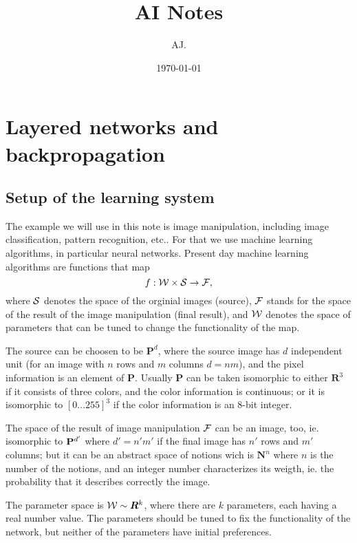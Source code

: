 \documentclass{article}
\title{AI Notes}
\author{AJ.}
\date{\today}
\begin{document}
\maketitle

\section{Layered networks and backpropagation}
\label{sec:lbp}

\subsection{Setup of the learning system}

The example we will use in this note is image manipulation, including
image classification, pattern recognition, etc.. For that we use
machine learning algorithms, in particular neural networks. Present
day machine learning algorithms are functions that map
\begin{equation}
  f :  {\cal W} \times {\cal S} \to {\cal F},
\end{equation}
where ${\cal S}$ denotes the space of the orginial images (source),
${\cal F}$ stands for the space of the result of the image
manipulation (final result), and ${\cal W}$ denotes the space of
parameters that can be tuned to change the functionality of the map.

The source can be choosen to be ${\bm P}^d$, where the source image
has $d$ independent unit (for an image with $n$ rows and $m$ columns
$d=nm$), and the pixel information is an element of $\bm P$. Usually
$\bm P$ can be taken isomorphic to either $\bm R^3$ if it consists of
three colors, and the color information is continuous; or it is
isomorphic to $[0...255]^3$ if the color information is an 8-bit
integer.

The space of the result of image manipulation ${\cal F}$ can be an
image, too, ie. isomorphic to ${\bf P}^{d'}$ where $d'=n'm'$ if the
final image has $n'$ rows and $m'$ columns; but it can be an abstract
space of notions wich is $\bm N^n$ where $n$ is the number of the
notions, and an integer number characterizes its weigth, ie. the
probability that it describes correctly the image.

The parameter space is ${\cal W}\sim \bm R^k$, where there are $k$
parameters, each having a real number value. The parameters should be
tuned to fix the functionality of the network, but neither of the
parameters have initial preferences. 
\end{document}
